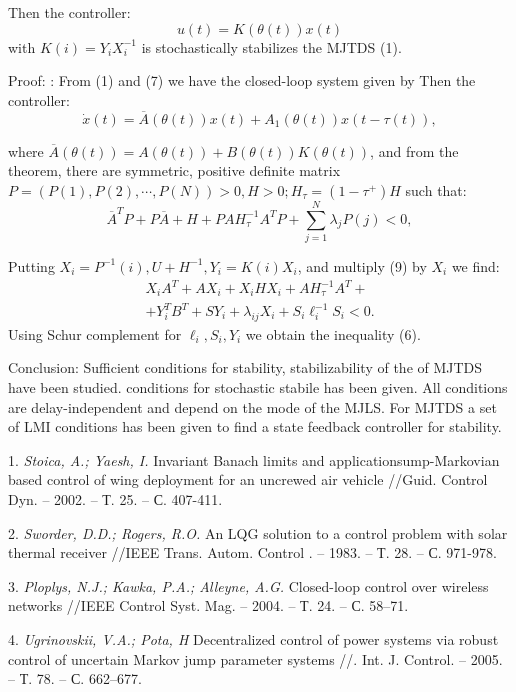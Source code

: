 Then the controller:
\begin{equation}
u(t)=K(\theta(t))x(t)
\end{equation}
with $K(i)=Y_i X_i^{-1}$ is stochastically stabilizes the MJTDS (1).

Proof: : From (1) and (7) we have the closed-loop system given by
Then the controller:
\begin{equation}
\dot{x}(t)=\overline A(\theta(t))x(t) +A_1(\theta(t))x(t-\tau(t)),
\end{equation}

where $\overline A(\theta(t))=A(\theta(t))+B(\theta(t))K(\theta(t))$,  and from the theorem, there are symmetric, positive definite matrix $P=(P(1),P(2),\cdots,P(N))>0 ,H>0; H_\tau =(1-\tau^+)H$ such that:
\begin{equation}
\overline A^TP +P\overline A+H+ PAH_\tau^{-1}A^TP+\sum_{j=1}^{N}\lambda_j P(j)<0,
\end{equation}

Putting  $X_i=P^{-1}(i), U+H^{-1}, Y_i=K(i)X_i$, and multiply (9) by $X_i$  we find:
\begin{multline}
X_iA^T+AX_i+X_iHX_i+AH_\tau ^{-1} A^T+
\\+
Y_i^TB^T+SY_i+\lambda_{ij}X_i+S_i\ell_i^{-1}S_i<0
.
\end{multline}
Using Schur complement for $\ell_i , S_i , Y_i$ we obtain the inequality (6).

Conclusion:
 Sufficient conditions for stability, stabilizability of the of MJTDS have been studied.  conditions for stochastic stabile has been given. All conditions are delay-independent and depend on the mode of the MJLS.  For  MJTDS a set of LMI conditions has been given to find a state feedback controller for stability.

\litlist

1. {\it Stoica, A.; Yaesh, I. }
 Invariant Banach limits and applicationsump-Markovian based control of wing deployment for an uncrewed air vehicle //Guid. Control Dyn. – 2002. – Т. 25.  – С. 407-411.

2. {\it Sworder, D.D.; Rogers, R.O.  }
 An LQG solution to a control problem with solar thermal receiver //IEEE Trans. Autom. Control . – 1983. – Т. 28. – С. 971-978.

3. {\it Ploplys, N.J.; Kawka, P.A.; Alleyne, A.G. }
 Closed-loop control over wireless networks //IEEE Control Syst. Mag. – 2004. – Т. 24.  – С. 58–71.

4. {\it Ugrinovskii, V.A.; Pota, H }
 Decentralized control of power systems via robust control of uncertain Markov jump parameter systems //. Int. J. Control. – 2005. – Т. 78. – С. 662–677.

